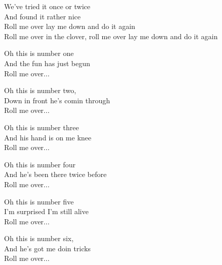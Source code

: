 \vspace{10pt}
We've tried it once or twice\\
And found it rather nice\\
Roll me over lay me down and do it again\\
Roll me over in the clover, roll me over lay me down and do it again\par
\vspace{10pt}
Oh this is number one \\
And the fun has just begun\\
Roll me over...\par
\vspace{10pt}
Oh this is number two,\\
Down in front he's comin through\\
Roll me over...\par
\vspace{10pt}
Oh this is number three\\
And his hand is on me knee\\
Roll me over...\par
\vspace{10pt}
Oh this is number four\\
And he's been there twice before\\
Roll me over...\par
\vspace{10pt}
Oh this is number five\\
I'm surprised I'm still alive\\
Roll me over...\par
\vspace{10pt}
Oh this is number six,\\
And he's got me doin tricks\\
Roll me over...
\newpage
